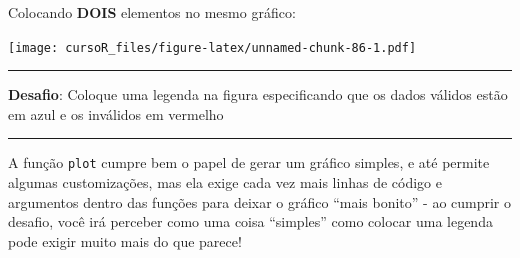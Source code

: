 \documentclass[]{book}
\newenvironment{Shaded}{\begin{snugshade}}{\end{snugshade}}
\newcommand{\KeywordTok}[1]{\textcolor[rgb]{0.13,0.29,0.53}{\textbf{#1}}}
\newcommand{\DataTypeTok}[1]{\textcolor[rgb]{0.13,0.29,0.53}{#1}}
\newcommand{\DecValTok}[1]{\textcolor[rgb]{0.00,0.00,0.81}{#1}}
\newcommand{\StringTok}[1]{\textcolor[rgb]{0.31,0.60,0.02}{#1}}
\newcommand{\CommentTok}[1]{\textcolor[rgb]{0.56,0.35,0.01}{\textit{#1}}}
\newcommand{\OperatorTok}[1]{\textcolor[rgb]{0.81,0.36,0.00}{\textbf{#1}}}
\newcommand{\NormalTok}[1]{#1}
\theoremstyle{definition}
\theoremstyle{definition}
\theoremstyle{definition}
\theoremstyle{remark}
\begin{document}
Colocando \textbf{DOIS} elementos no mesmo gráfico:

\begin{Shaded}
\end{Shaded}

\texttt{[image: cursoR\_files/figure-latex/unnamed-chunk-86-1.pdf]}

\begin{center}\rule{0.5\linewidth}{\linethickness}\end{center}

{\textbf{Desafio}: Coloque uma legenda na figura especificando que os
dados válidos estão em azul e os inválidos em vermelho }

\begin{center}\rule{0.5\linewidth}{\linethickness}\end{center}

A função \texttt{plot} cumpre bem o papel de gerar um gráfico simples, e
até permite algumas customizações, mas ela exige cada vez mais linhas de
código e argumentos dentro das funções para deixar o gráfico ``mais
bonito'' - ao cumprir o desafio, você irá perceber como uma coisa
``simples'' como colocar uma legenda pode exigir muito mais do que
parece!
\end{document}
